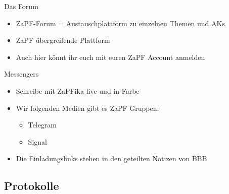 \documentclass[compress,]{beamer}
\begin{document}
\begin{frame}{Das Forum}

\begin{itemize}[<+->]
	\item ZaPF-Forum = Austauschplattform zu einzelnen Themen und AKs
	\item ZaPF übergreifende Plattform
	\item Auch hier könnt ihr euch mit euren ZaPF Account anmelden

\end{itemize}

\end{frame}

\begin{frame}{Messengers}

\begin{itemize}[<+->]
	\item Schreibe mit ZaPFika live und in Farbe
	\item Wir folgenden Medien gibt es ZaPF Gruppen:
		\begin{itemize}
			\item Telegram
			\item Signal %
		\end{itemize}
	\item Die Einladungslinks stehen in den geteilten Notizen von BBB	
\end{itemize}

\end{frame}


%
%



\subsection{Protokolle}
\end{document}
